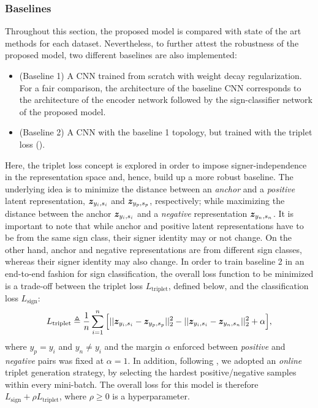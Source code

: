 \subsubsection{Baselines}
Throughout this section, the proposed model is compared with state of the art methods for each dataset. Nevertheless, to further attest the robustness of the proposed model, two different baselines are also implemented:
\begin{itemize}
    \item (Baseline 1) A CNN trained from scratch with weight decay regularization. For a fair comparison, the architecture of the baseline CNN corresponds to the architecture of the encoder network followed by the sign-classifier network of the proposed model.
    \item (Baseline 2) A CNN with the baseline 1 topology, but trained with the triplet loss (\citet{Schroff2015}).
\end{itemize}
Here, the triplet loss concept is explored in order to impose signer-independence in the representation space and, hence, build up a more robust baseline. The underlying idea is to minimize the distance between an \textit{anchor} and a \textit{positive} latent representation, ${\bm{z}}_{y_{i}, s_{i}}$ and ${\bm{z}}_{y_{p}, s_{p}}$, respectively; while maximizing the distance between the anchor ${\bm{z}}_{y_{i}, s_{i}}$ and a \textit{negative} representation ${\bm{z}}_{y_{n}, s_{n}}$. It is important to note that while anchor and positive latent representations have to be from the same sign class, their signer identity may or not change. On the other hand, anchor and negative representations are from different sign classes, whereas their signer identity may also change. In order to train baseline 2 in an end-to-end fashion for sign classification, the overall loss function to be minimized is a trade-off between the triplet loss $L_{\text{triplet}}$, defined below, and the classification loss $L_{\text{sign}}$:
\begin{equation}
L_{\text{triplet}} \triangleq \frac{1}{n}\sum_{i=1}^{n}\Big[||{\bm{z}}_{y_{i}, s_{i}}-{\bm{z}}_{y_{p}, s_{p}}||^2_2 - ||{\bm{z}}_{y_{i}, s_{i}}-{\bm{z}}_{y_{n}, s_{n}}||^2_2 + \alpha\Big],
\end{equation}
where $y_{p}=y_{i}$ and $y_{n} \neq y_{i}$ and the margin $\alpha$ enforced between \emph{positive} and \emph{negative} pairs was fixed at $\alpha=1$. In addition, following \citet{Schroff2015}, we adopted an \emph{online} triplet generation strategy, by selecting the hardest positive/negative samples within every mini-batch. The overall loss for this model is therefore $L_{\text{sign}} + \rho L_{\text{triplet}}$, where $\rho \geq 0$ is a hyperparameter.

